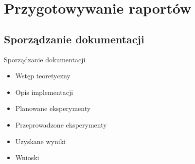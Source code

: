 \documentclass{beamer}
\begin{document}
\section{Przygotowywanie raportów}
\subsection{Sporządzanie dokumentacji}
\begin{frame}{Sporządzanie dokumentacji}
	\begin{itemize}
		\item{Wstęp teoretyczny}
		\item{Opis implementacji}
		\item{Planowane eksperymenty}
		\item{Przeprowadzone eksperymenty}
		\item{Uzyskane wyniki}
		\item{Wnioski}
	\end{itemize}
\end{frame}
\end{document}
